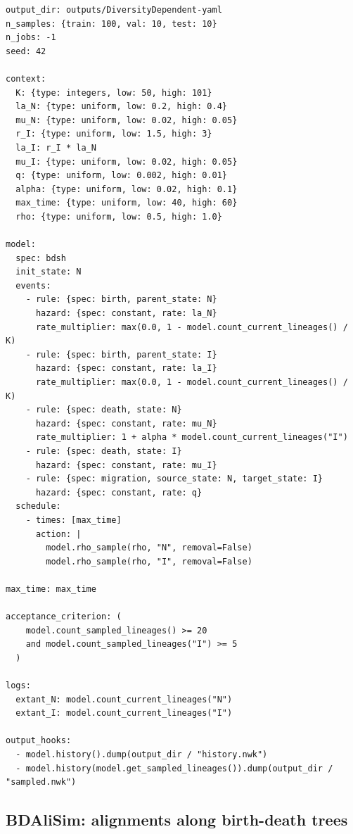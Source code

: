 \documentclass[11pt]{article}
\begin{document}
\begin{lstlisting}[style=cfg]
output_dir: outputs/DiversityDependent-yaml
n_samples: {train: 100, val: 10, test: 10}
n_jobs: -1
seed: 42

context:
  K: {type: integers, low: 50, high: 101}
  la_N: {type: uniform, low: 0.2, high: 0.4}
  mu_N: {type: uniform, low: 0.02, high: 0.05}
  r_I: {type: uniform, low: 1.5, high: 3}
  la_I: r_I * la_N
  mu_I: {type: uniform, low: 0.02, high: 0.05}
  q: {type: uniform, low: 0.002, high: 0.01}
  alpha: {type: uniform, low: 0.02, high: 0.1}
  max_time: {type: uniform, low: 40, high: 60}
  rho: {type: uniform, low: 0.5, high: 1.0}

model:
  spec: bdsh
  init_state: N
  events:
    - rule: {spec: birth, parent_state: N}
      hazard: {spec: constant, rate: la_N}
      rate_multiplier: max(0.0, 1 - model.count_current_lineages() / K)
    - rule: {spec: birth, parent_state: I}
      hazard: {spec: constant, rate: la_I}
      rate_multiplier: max(0.0, 1 - model.count_current_lineages() / K)
    - rule: {spec: death, state: N}
      hazard: {spec: constant, rate: mu_N}
      rate_multiplier: 1 + alpha * model.count_current_lineages("I")
    - rule: {spec: death, state: I}
      hazard: {spec: constant, rate: mu_I}
    - rule: {spec: migration, source_state: N, target_state: I}
      hazard: {spec: constant, rate: q}
  schedule:
    - times: [max_time]
      action: |
        model.rho_sample(rho, "N", removal=False)
        model.rho_sample(rho, "I", removal=False)

max_time: max_time

acceptance_criterion: (
    model.count_sampled_lineages() >= 20
    and model.count_sampled_lineages("I") >= 5
  )

logs:
  extant_N: model.count_current_lineages("N")
  extant_I: model.count_current_lineages("I")

output_hooks:
  - model.history().dump(output_dir / "history.nwk")
  - model.history(model.get_sampled_lineages()).dump(output_dir / "sampled.nwk")
\end{lstlisting}

\subsection{BDAliSim: alignments along birth-death trees}
\label{sec:bd-alisim}
\end{document}
